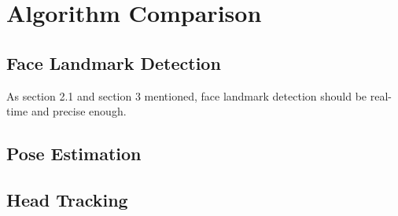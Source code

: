 \section{Algorithm Comparison}

\subsection{Face Landmark Detection}
As section 2.1 and section 3 mentioned, face landmark detection should be real-time and precise enough.

\subsection{Pose Estimation}
\lipsum[0]

\subsection{Head Tracking}
\lipsum[0]




